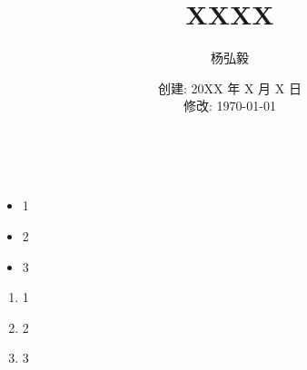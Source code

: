 \documentclass[11pt]{article}
\title{XXXX}
\author{杨弘毅}
\date{创建: 20XX 年 X 月 X 日 \\修改: \today}
\begin{document}
\maketitle

\section{}

\subsection{}

\subsubsection{}

\begin{equation*}
\end{equation*}

\begin{align*}
\end{align*}

\begin{itemize}
	\setlength{\itemsep}{0em}
	\item 1
	\item 2
	\item 3
\end{itemize}

\begin{enumerate}
	\setlength{\itemsep}{0em}
	\item 1
	\item 2
	\item 3
\end{enumerate}

\begin{figure}[ht!]
	\centering
	\caption{}
\end{figure}
\end{document}
